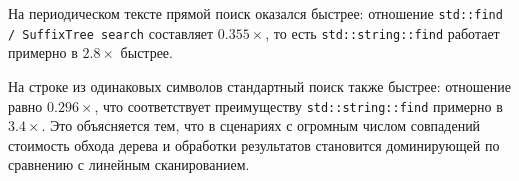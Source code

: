 На периодическом тексте прямой поиск оказался быстрее: отношение
\texttt{std::find / SuffixTree search} составляет \(0.355\times\), то есть
\texttt{std::string::find} работает примерно в \(2.8\times\) быстрее.

На строке из одинаковых символов стандартный поиск также быстрее:
отношение равно \(0.296\times\), что соответствует преимуществу
\texttt{std::string::find} примерно в \(3.4\times\). Это объясняется тем, что
в сценариях с огромным числом совпадений стоимость обхода дерева и обработки
результатов становится доминирующей по сравнению с линейным сканированием.
\pagebreak
